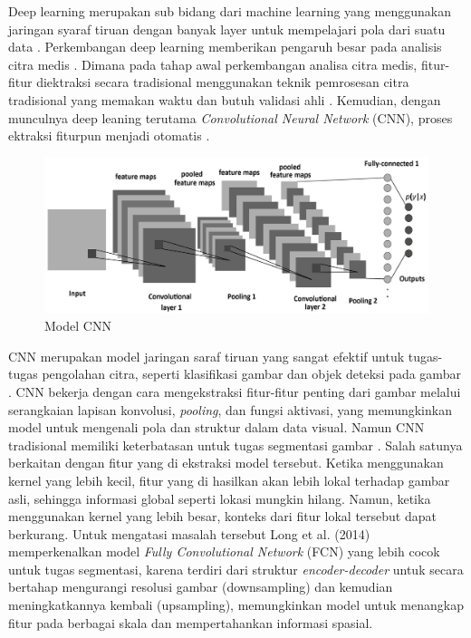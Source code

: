 \noindent Deep learning merupakan sub bidang dari machine learning yang menggunakan jaringan syaraf tiruan dengan banyak layer untuk mempelajari pola dari suatu data \cite{goodfellow_deep_2016,yang_deep_2023}. Perkembangan deep learning memberikan pengaruh besar pada analisis citra medis \cite{sistaninejhad_review_2023}. Dimana pada tahap awal perkembangan analisa citra medis, fitur-fitur diektraksi secara tradisional menggunakan teknik pemrosesan citra tradisional yang memakan waktu dan butuh validasi ahli \cite{huang_fully_2022}.  Kemudian, dengan munculnya deep leaning terutama \textit{Convolutional Neural Network} (CNN), proses ektraksi fiturpun menjadi otomatis \cite{huang_fully_2022,azad_medical_2022}. 

\begin{figure}[H]
	\centering
	\includegraphics[scale=.1]{gambar/CNN.PNG}
	\caption{Model CNN \cite{albelwi_framework_2017}}
	\label{fig:CNN}
\end{figure}

\noindent CNN merupakan model jaringan saraf tiruan yang sangat efektif untuk tugas-tugas pengolahan citra, seperti klasifikasi gambar dan objek deteksi pada gambar \cite{celeghin_convolutional_2023}. CNN bekerja dengan cara mengekstraksi fitur-fitur penting dari gambar melalui serangkaian lapisan konvolusi, \textit{pooling}, dan fungsi aktivasi, yang memungkinkan model untuk mengenali pola dan struktur dalam data visual. Namun CNN tradisional memiliki keterbatasan untuk tugas segmentasi  gambar \cite{huang_fully_2022, azad_medical_2022, jasim_towards_2023}. Salah satunya berkaitan dengan fitur yang di ekstraksi model tersebut. Ketika menggunakan kernel yang lebih kecil, fitur yang di hasilkan akan lebih lokal terhadap gambar asli, sehingga informasi global seperti lokasi mungkin hilang. Namun, ketika menggunakan kernel yang lebih besar, konteks dari fitur lokal tersebut dapat berkurang. Untuk mengatasi masalah tersebut Long et al. (2014) \cite{long_fully_2014} memperkenalkan model \textit{Fully Convolutional Network} (FCN) yang lebih cocok untuk tugas segmentasi, karena terdiri dari struktur \textit{encoder-decoder} untuk secara bertahap mengurangi resolusi gambar (downsampling) dan kemudian meningkatkannya kembali (upsampling), memungkinkan model untuk menangkap fitur pada berbagai skala dan mempertahankan informasi spasial.


